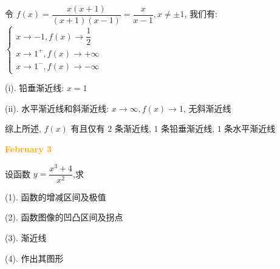 \begin{solution}

	令 $f(x) = \dfrac{x(x+1)}{(x+1)(x-1)}=\dfrac{x}{x-1},x\neq \pm 1$, 我们有: 
	$\begin{cases}
	x\to -1, f(x)\to \dfrac{1}{2}\\
	x\to 1^{+}, f(x)\to +\infty\\
	x\to 1^{-}, f(x)\to -\infty
	\end{cases}$

	(i). 铅垂渐近线: $x = 1$

	(ii). 水平渐近线和斜渐近线: $x\to \infty, f(x)\to 1$, 无斜渐近线

	综上所述, $f(x)$ 有且仅有 $2$ 条渐近线, $1$ 条铅垂渐近线, $1$ 条水平渐近线
\end{solution}

\textcolor{orange}{\textbf{February 3}}

\begin{example}[][Exam: 28.1.5]
	设函数 $y=\dfrac{x^{3}+4}{x^{2}}$,求

(1). 函数的增减区间及极值

(2). 函数图像的凹凸区间及拐点

(3). 渐近线

(4). 作出其图形
\end{example}

